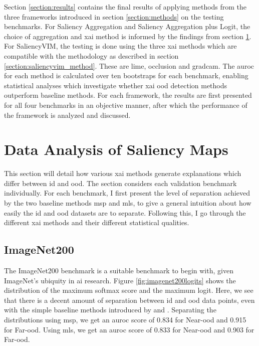 \documentclass[UKenglish]{uiomasterthesis} %
\theoremstyle{definition}
\begin{document}
Section \ref{section:results} contains the final results of applying methods from the three frameworks introduced in section \ref{section:methods} on the testing benchmarks. For Saliency Aggregation and Saliency Aggregation plus Logit, the choice of aggregation and \ac{xai} method is informed by the findings from section \ref{section:saliencyagg}. For SaliencyVIM, the testing is done using the three \ac{xai} methods which are compatible with the methodology as described in section \ref{section:saliencyvim_method}. These are \ac{lime}, occlusion and \ac{gradcam}. The \ac{auroc} for each method is calculated over ten bootstraps for each benchmark, enabling statistical analyses which investigate whether \ac{xai} \ac{ood} detection methods outperform baseline methods. For each framework, the results are first presented for all four benchmarks in an objective manner, after which the performance of the framework is analyzed and discussed.

\section{Data Analysis of Saliency Maps} \label{section:saliencyagg}

This section will detail how various \ac{xai} methods generate explanations which differ between \ac{id} and \ac{ood}. The section considers each validation benchmark individually. For each benchmark, I first present the level of separation achieved by the two baseline methods \ac{msp} and \ac{mls}, to give a general intuition about how easily the \ac{id} and \ac{ood} datasets are to separate. Following this, I go through the different \ac{xai} methods and their different statistical qualities.

\subsection{ImageNet200}

The ImageNet200 benchmark is a suitable benchmark to begin with, given ImageNet's ubiquity in \ac{ai} research. Figure \ref{fig:imagenet200logits} shows the distribution of the maximum softmax score and the maximum logit. Here, we see that there is a decent amount of separation between \ac{id} and \ac{ood} data points, even with the simple baseline methods introduced by \cite{oodbaseline} and \cite{mls}. Separating the distributions using \ac{msp}, we get an \ac{auroc} score of 0.834 for Near-\ac{ood} and 0.915 for Far-\ac{ood}. Using \ac{mls}, we get an \ac{auroc} score of 0.833 for Near-\ac{ood} and 0.903 for Far-\ac{ood}.
\end{document}
